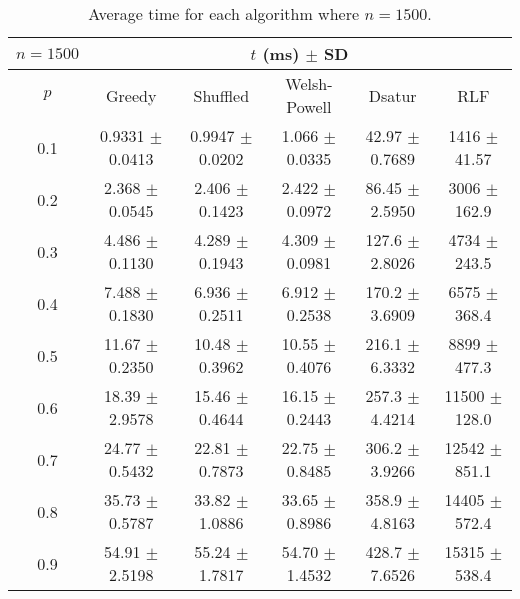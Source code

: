 \begin{table}[H]
    \centering
    \begin{tabular}{cccccc}
        
        $n = 1500$& \multicolumn{5}{c}{$t$ (\unit{ms}) $\pm$ SD} \\
        \hline
        $p$ & Greedy & Shuffled & Welsh-Powell & Dsatur & RLF \\
        \hline
         0.1 & 0.9331 $\pm$ 0.0413 & 0.9947 $\pm$ 0.0202 & 1.066 $\pm$ 0.0335 & 42.97 $\pm$ 0.7689 & 1416 $\pm$ 41.57 \\
        0.2 & 2.368 $\pm$ 0.0545 & 2.406 $\pm$ 0.1423 & 2.422 $\pm$ 0.0972 & 86.45 $\pm$ 2.5950 & 3006 $\pm$ 162.9 \\
        0.3 & 4.486 $\pm$ 0.1130 & 4.289 $\pm$ 0.1943 & 4.309 $\pm$ 0.0981 & 127.6 $\pm$ 2.8026 & 4734 $\pm$ 243.5 \\
        0.4 & 7.488 $\pm$ 0.1830 & 6.936 $\pm$ 0.2511 & 6.912 $\pm$ 0.2538 & 170.2 $\pm$ 3.6909 & 6575 $\pm$ 368.4 \\
        0.5 & 11.67 $\pm$ 0.2350 & 10.48 $\pm$ 0.3962 & 10.55 $\pm$ 0.4076 & 216.1 $\pm$ 6.3332 & 8899 $\pm$ 477.3 \\
        0.6 & 18.39 $\pm$ 2.9578 & 15.46 $\pm$ 0.4644 & 16.15 $\pm$ 0.2443 & 257.3 $\pm$ 4.4214 & 11500 $\pm$ 128.0 \\
        0.7 & 24.77 $\pm$ 0.5432 & 22.81 $\pm$ 0.7873 & 22.75 $\pm$ 0.8485 & 306.2 $\pm$ 3.9266 & 12542 $\pm$ 851.1 \\
        0.8 & 35.73 $\pm$ 0.5787 & 33.82 $\pm$ 1.0886 & 33.65 $\pm$ 0.8986 & 358.9 $\pm$ 4.8163 & 14405 $\pm$ 572.4 \\
        0.9 & 54.91 $\pm$ 2.5198 & 55.24 $\pm$ 1.7817 & 54.70 $\pm$ 1.4532 & 428.7 $\pm$ 7.6526 & 15315 $\pm$ 538.4 \\
   
        \hline
    \end{tabular}
    \caption{Average time for each algorithm where $n = 1500$.}
    \label{tab:avgTimeforV1500}
\end{table}